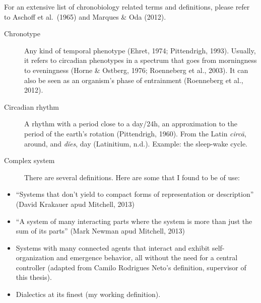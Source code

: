\documentclass[
  12pt,
  a4paper,
  oneside]{tesesusp}
\providecommand{\tightlist}{%
  \setlength{\itemsep}{0pt}\setlength{\parskip}{0pt}}\usepackage{longtable,booktabs,array}
\begin{document}

\setlength{\absparsep}{12pt}
\begin{termos}
For an extensive list of chronobiology related terms and definitions,
please refer to Aschoff et al.~(1965) and Marques \& Oda (2012).

\begin{description}
\item[Chronotype]
\hspace{20cm}

Any kind of temporal phenotype (Ehret, 1974; Pittendrigh, 1993).
Usually, it refers to circadian phenotypes in a spectrum that goes from
morningness to eveningness (Horne \& Ostberg, 1976; Roenneberg et al.,
2003). It can also be seen as an organism's phase of entrainment
(Roenneberg et al., 2012).
\end{description}

\begin{description}
\item[Circadian rhythm]
\hspace{20cm}

A rhythm with a period close to a day/24h, an approximation to the
period of the earth's rotation (Pittendrigh, 1960). From the Latin
\emph{circā}, around, and \emph{dĭes}, day (Latinitium, n.d.). Example:
the sleep-wake cycle.
\end{description}

\begin{description}
\item[Complex system]
\hspace{20cm}

There are several definitions. Here are some that I found to be of use:
\end{description}

\begin{itemize}
\tightlist
\item
  ``Systems that don't yield to compact forms of representation or
  description'' (David Krakauer apud Mitchell, 2013)
\item
  ``A system of many interacting parts where the system is more than
  just the sum of its parts'' (Mark Newman apud Mitchell, 2013)
\item
  Systems with many connected agents that interact and exhibit
  self-organization and emergence behavior, all without the need for a
  central controller (adapted from Camilo Rodrigues Neto's definition,
  supervisor of this thesis).
\item
  Dialectics at its finest (my working definition).
\end{itemize}


\end{termos}
\end{document}

